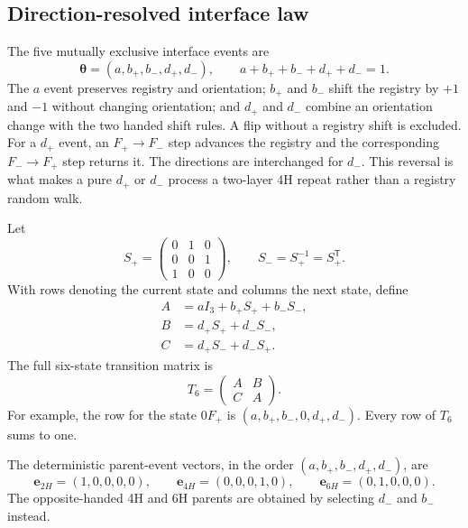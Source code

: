 \documentclass[11pt]{article}
\begin{document}
\subsection{Direction-resolved interface law}

The five mutually exclusive interface events are
\begin{equation}
 \boldsymbol{\theta}=(a,b_+,b_-,d_+,d_-),\qquad
 a+b_++b_-+d_++d_-=1.
 \label{eq:si_pbi2_interface_law}
\end{equation}
The $a$ event preserves registry and orientation; $b_+$ and $b_-$ shift the
registry by $+1$ and $-1$ without changing orientation; and $d_+$ and $d_-$
combine an orientation change with the two handed shift rules.  A flip without
a registry shift is excluded.  For a $d_+$ event, an $F_+\rightarrow F_-$ step
advances the registry and the corresponding $F_-\rightarrow F_+$ step returns
it.  The directions are interchanged for $d_-$.  This reversal is what makes a
pure $d_+$ or $d_-$ process a two-layer 4H repeat rather than a registry random
walk.

Let
\begin{equation}
 S_+=\begin{pmatrix}0&1&0\\0&0&1\\1&0&0\end{pmatrix},\qquad
 S_-=S_+^{-1}=S_+^{\mathsf T}.
 \label{eq:si_pbi2_shift_matrices}
\end{equation}
With rows denoting the current state and columns the next state, define
\begin{align}
 A&=aI_3+b_+S_+ +b_-S_-,\\
 B&=d_+S_+ +d_-S_-,\\
 C&=d_+S_- +d_-S_+.
\end{align}
The full six-state transition matrix is
\begin{equation}
 T_6=\begin{pmatrix}A&B\\C&A\end{pmatrix}.
 \label{eq:si_pbi2_T6}
\end{equation}
For example, the row for the state $0F_+$ is
$(a,b_+,b_-,0,d_+,d_-)$.  Every row of $T_6$ sums to one.

The deterministic parent-event vectors, in the order
$(a,b_+,b_-,d_+,d_-)$, are
\begin{equation}
 \mathbf e_{2H}=(1,0,0,0,0),\qquad
 \mathbf e_{4H}=(0,0,0,1,0),\qquad
 \mathbf e_{6H}=(0,1,0,0,0).
 \label{eq:si_pbi2_parent_vectors}
\end{equation}
The opposite-handed 4H and 6H parents are obtained by selecting $d_-$ and
$b_-$ instead.
\end{document}
